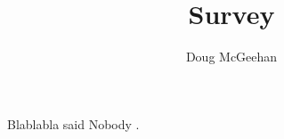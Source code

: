 \documentclass[11pt]{article}
\begin{document}
\title{Survey}
\author{Doug McGeehan}

\maketitle

Blablabla said Nobody \cite{Cho:2011:FMU:2020408.2020579}\cite{6199868}\cite{Do:2012:CCM:2370216.2370242}\cite{DeDomenico2013798}\cite{Do201479}\cite{Isaacman:2012:HMM:2307636.2307659}\cite{Karamshuk201419}\cite{Lichman:2014:MHL:2623330.2623681}\cite{6477064}\cite{McInerney:2012:ILP:2370216.2370420}\cite{6149582}\cite{Ranjan:2012:CDR:2412096.2412101}\cite{6813948}\cite{1717434}\cite{Treurniet:2014:TSM:2620784.2616973}\cite{Zhang:2014:EHM:2639108.2639116}\cite{6671589}\cite{6848068}\cite{Pirozmand201445}\cite{Leontiadis:2014:CSE:2674005.2674982}\cite{Song19022010}\cite{Lu2013}\cite{Deville11112014}\cite{Gonzalez2008}\cite{6377243}\cite{Schneider}\cite{Perkins}.

{}

\end{document}
